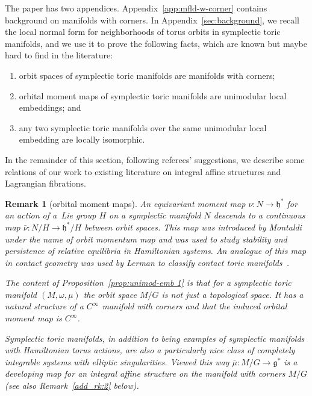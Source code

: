 \documentclass[pdftex]{sigma}
\numberwithin{equation}{section}
\newtheorem{Remark}[Lemma]{Remark}
\begin{document}
The paper has two appendices.
Appendix~\ref{app:mfld-w-corner} contains background on manifolds with corners.
In Appendix~\ref{sec:background}, we recall the local normal form for
neighborhoods of torus orbits in symplectic toric manifolds,
and we use it to prove the following facts,
which are known but maybe hard to f\/ind in the literature:
\begin{enumerate}[1)]\itemsep=0pt
\item
orbit spaces of symplectic toric manifolds are
manifolds with corners;
\item
orbital moment maps of symplectic toric manifolds are
unimodular local embeddings; and
\item
any two symplectic toric manifolds over the same unimodular local embedding
are locally isomorphic.
\end{enumerate}


In the remainder of this section, following referees' suggestions,
we describe some relations of our work to existing literature
on integral af\/f\/ine structures and Lagrangian f\/ibrations.

\begin{Remark}[orbital moment maps]\label{add_rk:1}
  An {\em equivariant} moment map $\nu\colon N\to {\mathfrak h}^*$ for an action of
  a~Lie group $H$ on a symplectic manifold $N$ descends to a
  continuous map $\bar{\nu}\colon N/H\to {\mathfrak h}^*/H$ between orbit spaces.
  This map was introduced by Montaldi~\cite{Montaldi} under the name
  of {\em orbit momentum map} and was used to study stability and
  persistence of relative equilibria in Hamiltonian systems.  An
  analogue of this map in contact geometry was used by Lerman to
  classify contact toric manifolds~\cite{Ltoric}.

  The content of Proposition~\ref{prop:unimod-emb 1} is that for a
  symplectic toric manifold $(M,\omega, \mu)$ the orbit space $M/G$ is
  not just a topological space.  It has a natural structure of a
  $C^\infty$ manifold with corners and that the induced orbital moment
  map is $C^\infty$.

  Symplectic toric manifolds, in addition to being examples of
  symplectic manifolds with Hamiltonian torus actions, are also a
  particularly nice class of completely integrable systems with
  elliptic singularities.  Viewed this way $\bar{\mu}\colon M/G\to {\mathfrak g}^*$ is
  a developing map for an integral af\/f\/ine structure on the manifold
  with corners $M/G$ (see also Remark~\ref{add_rk:2} below).
\end{Remark}
\end{document}
